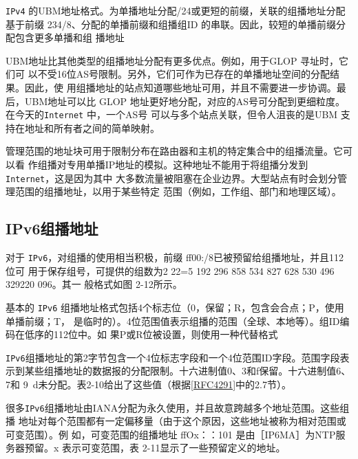 \verb|IPv4| 的UBM地址格式。为单播地址分配/24或更短的前缀，关联的组播地址分配基于前缀
234/8、分配的单播前缀和组播组ID 的串联。因此，较短的单播前缀分配包含更多单播和组
播地址

UBM地址比其他类型的组播地址分配有更多优点。例如，用于GLOP 寻址时，它们可
以不受16位AS号限制。另外，它们可作为已存在的单播地址空间的分配结果。因此，使
用组播地址的站点知道哪些地址可用，并且不需要进一步协调。最后，UBM地址可以比
GLOP 地址更好地分配，对应的AS号可分配到更细粒度。在今天的\verb|Internet| 中，一个AS号
可以与多个站点关联，但令人沮丧的是UBM 支持在地址和所有者之间的简单映射。

管理范围的地址块可用于限制分布在路由器和主机的特定集合中的组播流量。它可以看
作组播对专用单播IP地址的模拟。这种地址不能用于将组播分发到 \verb|Internet|，这是因为其中
大多数流量被阻塞在企业边界。大型站点有时会划分管理范围的组播地址，以用于某些特定
范围（例如，工作组、部门和地理区域）。

\subsection{IPv6组播地址}

对于 \verb|IPv6|，对组播的使用相当积极，前缀 ff00:/8已被预留给组播地址，并且112位可
用于保存组号，可提供的组数为2 22=5 192 296 858 534 827 628 530 496 329220 096。其一
般格式如图 2-12所示。

基本的 \verb|IPv6| 组播地址格式包括4个标志位（0，保留；R，包含会合点；P，使用单播前缀；T，
是临时的）。4位范围值表示组播的范围（全球、本地等）。组ID编码在低序的112位中。如
果P或R位被设置，则使用一种代替格式

\verb|IPv6|组播地址的第2字节包含一个4位标志字段和一个4位范围ID字段。范围字段表
示到某些组播地址的数据报的分配限制。十六进制值0、3和f保留。十六进制值6、7和
9~d未分配。表2-10给出了这些值（根据\href{https://www.rfc-editor.org/rfc/rfc4291}{[RFC4291]}中的2.7节）。

很多\verb|IPv6|组播地址由IANA分配为永久使用，并且故意跨越多个地址范围。这些组播
地址对每个范围都有一定偏移量（由于这个原因，这些地址被称为相对范围或可变范围）。例
如，可变范围的组播地址 ffOx：：101 是由［IP6MA］为NTP服务器预留。x 表示可变范围，表
2-11显示了一些预留定义的地址。

